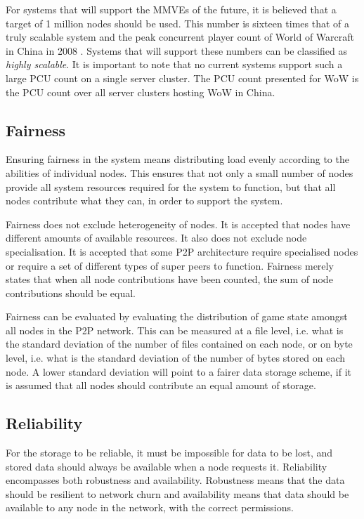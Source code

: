 For systems that will support the MMVEs of the future, it is believed that a target of 1 million nodes should be used. This number is sixteen times
that of a truly scalable system and the peak concurrent player count of World of Warcraft in China in 2008 \cite{WoW_china_pcu}. Systems that will
support these numbers can be classified as \emph{highly scalable}. It is important to note that no current systems support such a large PCU count on
a single server cluster. The PCU count presented for WoW is the PCU count over all server clusters hosting WoW in China.

\subsection{Fairness}
Ensuring fairness in the system means distributing load evenly according to the abilities of individual nodes. This ensures that not only a small
number of nodes provide all system resources required for the system to function, but that all nodes contribute what they can, in order to support
the system.

Fairness does not exclude heterogeneity of nodes. It is accepted that nodes have different amounts of available resources. It also does not exclude node specialisation. It is accepted that some P2P architecture require specialised nodes or require a set of different types of super peers to function. Fairness merely states that when all node contributions have been counted, the sum of node contributions should be equal.

Fairness can be evaluated by evaluating the distribution of game state amongst all nodes in the P2P network. This can be measured at a file level,
i.e. what is the standard deviation of the number of files contained on each node, or on byte level, i.e. what is the standard deviation of the number of bytes stored on
each node. A lower standard deviation will point to a fairer data storage scheme, if it is assumed that all nodes should contribute an equal amount of storage.

\subsection{Reliability}

For the storage to be reliable, it must be impossible for data to be lost, and stored data should always be available when a node requests it.
Reliability encompasses both robustness and availability. Robustness means that the data should be resilient to network churn and availability means
that data should be available to any node in the network, with the correct permissions.

